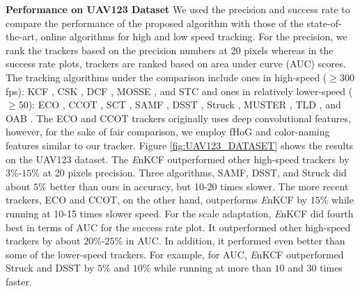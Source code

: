 \documentclass[10pt,twocolumn,letterpaper]{article}
\begin{document}
\textbf{Performance on UAV123 Dataset} We used the precision and
success rate to compare the performance of the proposed algorithm with
those of the state-of-the-art, online algorithms for high and low speed
tracking. For the precision, we rank the trackers based on the
precision numbers at 20 pixels whereas in the success rate plots,
trackers are ranked based on area under curve (AUC) scores. The
tracking algorithms under the comparison include ones in high-speed
($\geq$300 fps): KCF \cite{henriques2015high}, CSK
\cite{henriques2012exploiting}, DCF \cite{henriques2015high}, MOSSE
\cite{bolme2010visual}, and STC \cite{zhang2014fast}
and ones in relatively lower-speed ($\geq$50): ECO \cite{DanelljanCVPR2017}, 
CCOT \cite{DanelljanECCV2016}, SCT \cite{Choi_2016_CVPR}, SAMF
\cite{li2014scale}, DSST \cite{danelljan2014accurate}, Struck
\cite{hare2012efficient}, MUSTER \cite{hong2015multi}, TLD
\cite{kalal2012tracking}, and OAB \cite{zhang2012robust}. The ECO and CCOT trackers
originally uses deep convolutional features, however, for the sake of fair comparison, we employ fHoG
and color-naming features similar to our tracker. Figure \ref{fig:UAV123_DATASET} shows 
the results on the UAV123 dataset. The {\it  E}nKCF outperformed other high-speed trackers by
$3\%$-$15\%$ at 20 pixels precision. Three algorithms, SAMF, DSST, and
Struck did about $5\%$ better than ours in accuracy, but 10-20 times
slower. The more recent trackers, ECO and CCOT, on the other hand, outperforms
{\it  E}nKCF by $15\%$ while running at 10-15 times slower speed. 
For the scale adaptation, {\it E}nKCF did fourth best in terms
of AUC for the success rate plot. It outperformed other high-speed trackers
 by about $20\%$-$25\%$ in AUC. In addition, it performed even better than some of the lower-speed trackers. 
For example, for AUC, {\it E}nKCF outperformed Struck and DSST by $5\%$ and $10\%$ while running at more
than $10$ and $30$ times faster.
\end{document}
